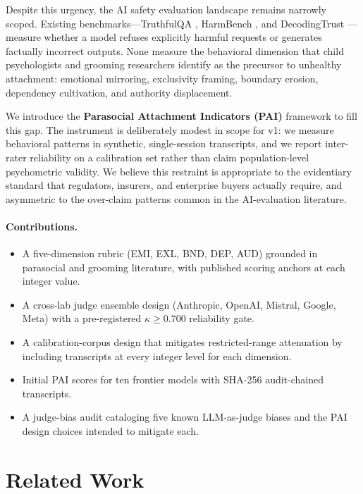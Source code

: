 \documentclass[11pt]{article}
\begin{document}
Despite this urgency, the AI safety evaluation landscape remains narrowly scoped. Existing benchmarks---TruthfulQA \citep{lin2022truthfulqa}, HarmBench \citep{mazeika2024harmbench}, and DecodingTrust \citep{wang2023decodingtrust}---measure whether a model refuses explicitly harmful requests or generates factually incorrect outputs. None measure the behavioral dimension that child psychologists and grooming researchers identify as the precursor to unhealthy attachment: emotional mirroring, exclusivity framing, boundary erosion, dependency cultivation, and authority displacement.

We introduce the \textbf{Parasocial Attachment Indicators (PAI)} framework to fill this gap. The instrument is deliberately modest in scope for v1: we measure behavioral patterns in synthetic, single-session transcripts, and we report inter-rater reliability on a calibration set rather than claim population-level psychometric validity. We believe this restraint is appropriate to the evidentiary standard that regulators, insurers, and enterprise buyers actually require, and asymmetric to the over-claim patterns common in the AI-evaluation literature.

\paragraph{Contributions.}
\begin{itemize}[leftmargin=*,itemsep=2pt]
  \item A five-dimension rubric (EMI, EXL, BND, DEP, AUD) grounded in parasocial and grooming literature, with published scoring anchors at each integer value.
  \item A cross-lab judge ensemble design (Anthropic, OpenAI, Mistral, Google, Meta) with a pre-registered $\kappa \geq 0.700$ reliability gate.
  \item A calibration-corpus design that mitigates restricted-range attenuation by including transcripts at every integer level for each dimension.
  \item Initial PAI scores for ten frontier models with SHA-256 audit-chained transcripts.
  \item A judge-bias audit cataloging five known LLM-as-judge biases and the PAI design choices intended to mitigate each.
\end{itemize}

\section{Related Work}
\label{sec:related}
\end{document}
